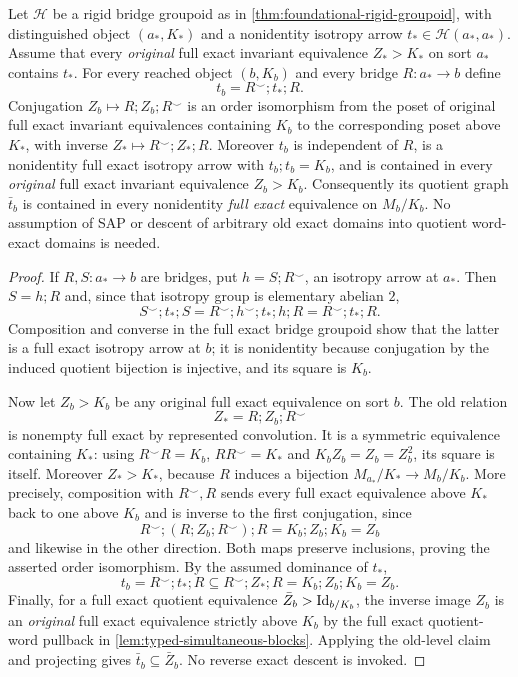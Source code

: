 \begin{lemma}
\label{lem:foundational-rigid-gate-transport}
Let $\mathcal H$ be a rigid bridge groupoid as in
\cref{thm:foundational-rigid-groupoid}, with distinguished object
$(a_*,K_*)$ and a nonidentity isotropy arrow
$t_*\in\mathcal H(a_*,a_*)$. Assume that every \emph{original}
full exact invariant equivalence $Z_*>K_*$ on sort $a_*$
contains $t_*$. For every reached object $(b,K_b)$ and every
bridge $R:a_*\to b$ define
\[
                         t_b=R^\smile;t_*;R.
\]
Conjugation $Z_b\mapsto R;Z_b;R^\smile$ is an order
isomorphism from the poset of original full exact invariant
equivalences containing $K_b$ to the corresponding poset
above $K_*$, with inverse $Z_*\mapsto R^\smile;Z_*;R$.
Moreover $t_b$ is independent of $R$, is a nonidentity full exact
isotropy arrow with $t_b;t_b=K_b$, and is contained in every
\emph{original} full exact invariant equivalence $Z_b>K_b$.
Consequently its quotient graph $\bar t_b$ is contained in every
nonidentity \emph{full exact} equivalence on $M_b/K_b$.
No assumption of SAP or descent of arbitrary old exact domains
into quotient word-exact domains is needed.
\end{lemma}
\begin{proof}
If $R,S:a_*\to b$ are bridges, put $h=S;R^\smile$, an
isotropy arrow at $a_*$. Then $S=h;R$ and, since that isotropy
group is elementary abelian $2$,
\[
 S^\smile;t_*;S=R^\smile;h^\smile;t_*;h;R
                  =R^\smile;t_*;R.
\]
Composition and converse in the full exact bridge groupoid
show that the latter is a full exact isotropy arrow at $b$;
it is nonidentity because conjugation by the induced quotient
bijection is injective, and its square is $K_b$.

Now let $Z_b>K_b$ be any original full exact equivalence
on sort $b$. The old relation
\[
                     Z_*=R;Z_b;R^\smile
\]
is nonempty full exact by represented convolution. It is a
symmetric equivalence containing $K_*$: using
$R^\smile R=K_b$, $RR^\smile=K_*$ and
$K_b Z_b=Z_b=Z_b^2$, its square is itself.
Moreover $Z_*>K_*$, because $R$ induces a bijection
$M_{a_*}/K_*\to M_b/K_b$. More precisely, composition
with $R^\smile,R$ sends every full exact equivalence above
$K_*$ back to one above $K_b$ and is inverse to the first
conjugation, since
\[
 R^\smile;(R;Z_b;R^\smile);R=K_b;Z_b;K_b=Z_b
\]
and likewise in the other direction. Both maps preserve
inclusions, proving the asserted order isomorphism.
By the assumed dominance of $t_*$,
\[
 t_b=R^\smile;t_*;R\subseteq
 R^\smile;Z_*;R=K_b;Z_b;K_b=Z_b.
\]
Finally, for a full exact quotient equivalence
$\bar Z_b>\mathrm{Id}_{b/K_b}$, the inverse image $Z_b$
is an \emph{original} full exact equivalence strictly above
$K_b$ by the full exact quotient-word pullback in
\cref{lem:typed-simultaneous-blocks}. Applying the old-level
claim and projecting gives $\bar t_b\subseteq\bar Z_b$.
No reverse exact descent is invoked.
\end{proof}


